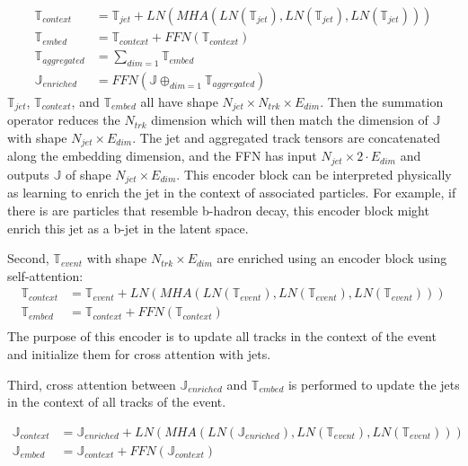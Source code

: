\begin{align}
    \mathbb{T}_{context} &= \mathbb{T}_{jet} + LN(MHA(LN(\mathbb{T}_{jet}), LN(\mathbb{T}_{jet}), LN(\mathbb{T}_{jet}))) \\
    \mathbb{T}_{embed} &= \mathbb{T}_{context} + FFN (\mathbb{T}_{context}) \\
    \mathbb{T}_{aggregated} &= \sum_{dim=1} \mathbb{T}_{embed} \\ 
    \mathbb{J}_{enriched} &= FFN(\mathbb{J} \mathop{\oplus}_{dim=1} \mathbb{T}_{aggregated})
\end{align}
$\mathbb{T}_{jet}$, $\mathbb{T}_{context}$, and $\mathbb{T}_{embed}$ all have shape $N_{jet} \times N_{trk} \times E_{dim}$. Then the summation operator reduces the $N_{trk}$ dimension which will then match the dimension of $\mathbb{J}$ with shape $N_{jet} \times E_{dim}$. The jet and aggregated track tensors are concatenated along the embedding dimension, and the FFN has input $N_{jet} \times 2\cdot E_{dim}$ and outputs $\mathbb{J}$ of shape $N_{jet} \times E_{dim}$. This encoder block can be interpreted physically as learning to enrich the jet in the context of associated particles. For example, if there is are particles that resemble b-hadron decay, this encoder block might enrich this jet as a b-jet in the latent space.

Second, $\mathbb{T}_{event}$ with shape $N_{trk} \times E_{dim}$ are enriched using an encoder block using self-attention:
\begin{align}
    \mathbb{T}_{context} &= \mathbb{T}_{event} + LN(MHA(LN(\mathbb{T}_{event}), LN(\mathbb{T}_{event}), LN(\mathbb{T}_{event}))) \\
    \mathbb{T}_{embed} &= \mathbb{T}_{context} + FFN (\mathbb{T}_{context}) \\
\end{align}
The purpose of this encoder is to update all tracks in the context of the event and initialize them for cross attention with jets.

Third, cross attention between $\mathbb{J}_{enriched}$ and $\mathbb{T}_{embed}$ is performed to update the jets in the context of all tracks of the event.

\begin{align}
    \mathbb{J}_{context} &= \mathbb{J}_{enriched} + LN(MHA(LN(\mathbb{J}_{enriched}), LN(\mathbb{T}_{event}), LN(\mathbb{T}_{event}))) \\
    \mathbb{J}_{embed} &= \mathbb{J}_{context} + FFN (\mathbb{J}_{context}) \\
\end{align}

